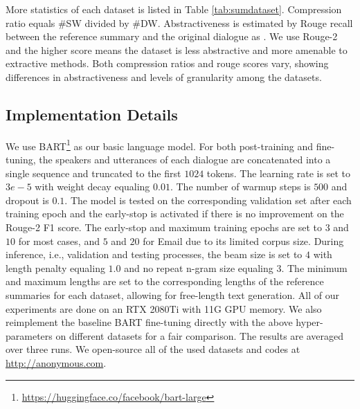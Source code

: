More statistics of each dataset is listed in Table \ref{tab:sumdataset}. Compression ratio equals \#SW divided by \#DW. %
Abstractiveness is estimated by Rouge recall between the reference summary and the original dialogue as \citet{liu2018generating}. We use Rouge-2 and the higher score means the dataset is less abstractive and more amenable to extractive methods. Both compression ratios and rouge scores vary, showing differences in abstractiveness and levels of granularity among the datasets.


\subsection{Implementation Details}

We use BART\footnote{\url{https://huggingface.co/facebook/bart-large}} as our basic language model. For both post-training and fine-tuning, the speakers and utterances of each dialogue are concatenated into a single sequence and truncated to the first $1024$ tokens.
The learning rate is set to $3e-5$ with weight decay equaling $0.01$. The number of warmup steps is $500$ and dropout is $0.1$. The model is tested on the corresponding validation set after each training epoch and %
the early-stop is activated if there is no improvement on the Rouge-2 F1 score. 
The early-stop and 
maximum training epochs are set to $3$ and $10$ for most cases, 
and $5$ and $20$ for Email due to its limited corpus size. 
During inference, i.e., validation and testing processes, 
the beam size is set to $4$ with length penalty equaling $1.0$ 
and no repeat n-gram size equaling $3$. 
The minimum and maximum lengths are set to the corresponding lengths 
of the reference summaries for each dataset, 
allowing for free-length text generation. 
All of our experiments are done on an RTX 2080Ti with 11G GPU 
memory. We also reimplement the baseline BART fine-tuning 
directly with the above hyper-parameters on different datasets for 
a fair comparison. The results are averaged over three runs. We open-source all of the used datasets and codes at \url{http://anonymous.com}.

